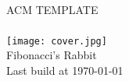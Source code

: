 \begin{titlepage}
	\pagestyle{empty}
  \begin{center}
		~\\[80pt]
    \fontsize{48pt}{\baselineskip}\selectfont  \textsc{ACM TEMPLATE}\\[8pt]
    ~\\[60pt]
    \texttt{[image: cover.jpg]}
    ~\\[100pt]
    \huge Fibonacci's Rabbit\\[8pt]
    \Large Last build at \today
  \end{center}
\end{titlepage}
\restoregeometry